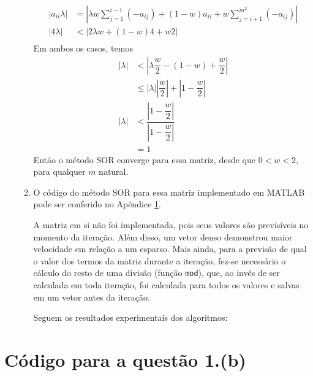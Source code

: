 \documentclass{article}
\begin{document}
\begin{enumerate}
\begin{enumerate}
                \begin{align*}
                    |a_{ii} \lambda| &= \left|\lambda w \sum_{j=1}^{i-1} (-a_{ij}) + (1-w)a_{ii} + w \sum_{j=i+1}^{m^2} (-a_{ij})\right| \\
                    |4 \lambda| &< \left|2\lambda w + (1-w)4 + w 2\right| \\
                \end{align*}
                Em ambos os casos, temos
                \begin{align*}
                    |\lambda| &< \left|\lambda \dfrac{w}{2} - (1-w) + \dfrac{w}{2} \right| \\
                    & \le |\lambda| \left|\dfrac{w}{2}\right| + \left|1 - \dfrac{w}{2}\right| \\
                    |\lambda| &< \dfrac{\left|1 - \dfrac{w}{2}\right|}{\left|1 - \dfrac{w}{2}\right|} \\
                    &= 1
                \end{align*}
                Então o método SOR converge para essa matriz, desde que $0 < w < 2$, para qualquer $m$ natural.

            \item O código do método SOR para essa matriz implementado em MATLAB pode ser conferido no Apêndice \ref{appendix:a}.
            
                A matriz em si não foi implementada, pois seus valores são previsíveis no momento da iteração.
                Além disso, um vetor denso demonstrou maior velocidade em relação a um esparso.
                Mais ainda, para a previsão de qual o valor dos termos da matriz durante a iteração, fez-se necessário
                o cálculo do resto de uma divisão (função \lstinline{mod}), que, ao invés de ser calculada em toda iteração,
                foi calculada para todos os valores e salvas em um vetor antes da iteração.

                Seguem os resultados experimentais dos algoritmos:
                
        \end{enumerate}
    \end{enumerate}

    \appendix

    \section{Código para a questão 1.(b)}
        \label{appendix:a}
\end{document}
